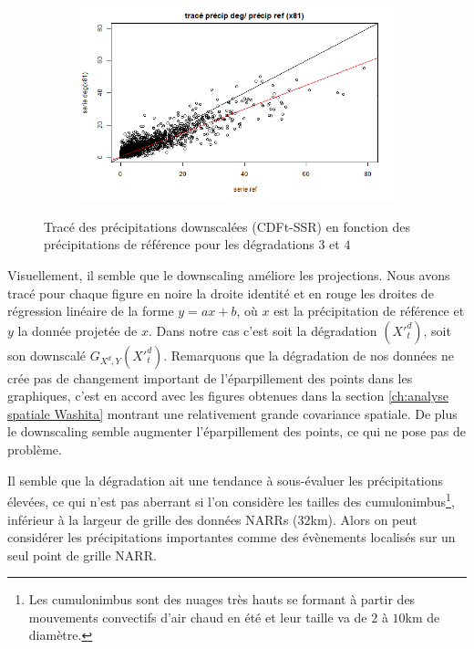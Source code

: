 \documentclass[a4paper,11pt]{article}
\numberwithin{equation}{section}
\begin{document}
\begin{figure}[H]
\begin{subfigure}[b]{0.45\textwidth}
	\end{subfigure}
	\hfill
	\begin{subfigure}[b]{0.45\textwidth}
		\includegraphics[scale=0.35]{images/pr_4_dg.png}
	\end{subfigure}
	\caption{Tracé des précipitations downscalées (CDFt-SSR) en fonction des précipitations de référence pour les dégradations $3$ et $4$}
\end{figure} 

Visuellement, il semble que le downscaling améliore les projections. Nous avons tracé pour chaque figure en noire la droite identité et en rouge les droites de régression linéaire de la forme $y=ax+b$, où $x$ est la précipitation de référence et $y$ la donnée projetée de $x$. Dans notre cas c'est soit la dégradation $(X'^d_t)$, soit son downscalé $G_{X^d,Y}(X'^{d}_t)$. Remarquons que la dégradation de nos données ne crée pas de changement important de l'éparpillement des points dans les graphiques, c'est en accord avec les figures obtenues dans la section \ref{ch:analyse spatiale Washita} montrant une relativement grande covariance spatiale. De plus le downscaling semble augmenter l'éparpillement des points, ce qui ne pose pas de problème.

Il semble que la dégradation ait une tendance à sous-évaluer les précipitations élevées, ce qui n'est pas aberrant si l'on considère les tailles des cumulonimbus\footnote{Les cumulonimbus sont des nuages très hauts se formant à partir des mouvements convectifs d'air chaud en été et leur taille va de $2$ à $10$km de diamètre.}, inférieur à la largeur de grille des données NARRs ($32$km). Alors on peut considérer les précipitations importantes comme des évènements localisés sur un seul point de grille NARR.
\end{document}
